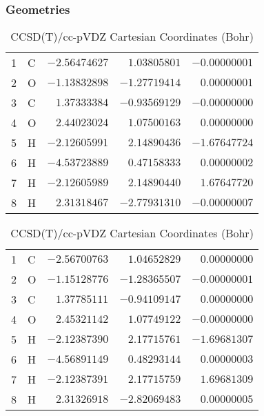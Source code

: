 \documentclass[10pt,oneside]{article}
\begin{document}
\begin{table}[h!]
\subsubsection*{Geometries}
\begin{multicols}{2}
\centering
\caption{CCSD(T)/cc-pVTZ Cartesian Coordinates (Bohr)}
\begin{tabular}{llrrr}
\toprule
1  & C  & $-2.56474627$ & $ 1.03805801$ & $-0.00000001$ \\
2  & O  & $-1.13832898$ & $-1.27719414$ & $ 0.00000001$ \\
3  & C  & $ 1.37333384$ & $-0.93569129$ & $-0.00000000$ \\
4  & O  & $ 2.44023024$ & $ 1.07500163$ & $ 0.00000000$ \\
5  & H  & $-2.12605991$ & $ 2.14890436$ & $-1.67647724$ \\
6  & H  & $-4.53723889$ & $ 0.47158333$ & $ 0.00000002$ \\
7  & H  & $-2.12605989$ & $ 2.14890440$ & $ 1.67647720$ \\
8  & H  & $ 2.31318467$ & $-2.77931310$ & $-0.00000007$ \\
\bottomrule
\end{tabular}
\caption{CCSD(T)/cc-pVDZ Cartesian Coordinates (Bohr)}
\begin{tabular}{llrrr}
\toprule
1  & C  & $-2.56700763$ & $ 1.04652829$ & $ 0.00000000$ \\
2  & O  & $-1.15128776$ & $-1.28365507$ & $-0.00000001$ \\
3  & C  & $ 1.37785111$ & $-0.94109147$ & $ 0.00000000$ \\
4  & O  & $ 2.45321142$ & $ 1.07749122$ & $-0.00000000$ \\
5  & H  & $-2.12387390$ & $ 2.17715761$ & $-1.69681307$ \\
6  & H  & $-4.56891149$ & $ 0.48293144$ & $ 0.00000003$ \\
7  & H  & $-2.12387391$ & $ 2.17715759$ & $ 1.69681309$ \\
8  & H  & $ 2.31326918$ & $-2.82069483$ & $ 0.00000005$ \\
\bottomrule
\end{tabular}
\end{multicols}
\end{table}
\end{document}
